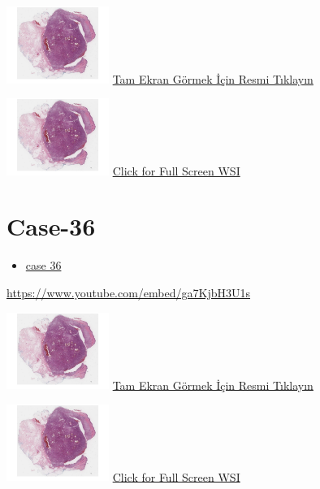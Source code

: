 \documentclass[
  letterpaper,
  paper=6in:9in,
  pagesize=pdftex,
  headinclude=on,
  footinclude=on,
  12pt]{scrbook}
\providecommand{\tightlist}{%
  \setlength{\itemsep}{0pt}\setlength{\parskip}{0pt}}\usepackage{longtable,booktabs,array}
\begin{document}
\href{https://images.patolojiatlasi.com/hacettepe-com-case-1/HE.html}{\includegraphics[width=0.25\textwidth,height=\textheight]{./screenshots/hacettepe-com-case-1_screenshot.png}}
\href{https://images.patolojiatlasi.com/hacettepe-com-case-/HE.html}{Tam
Ekran Görmek İçin Resmi Tıklayın}

\href{https://images.patolojiatlasi.com/hacettepe-com-case-1/HE.html}{\includegraphics[width=0.25\textwidth,height=\textheight]{./screenshots/hacettepe-com-case-1_screenshot.png}}
\href{https://images.patolojiatlasi.com/hacettepe-com-case-/HE.html}{Click
for Full Screen WSI}

\hypertarget{sec-hacettepe-case-of-the-month-case-36}{%
\section{Case-36}\label{sec-hacettepe-case-of-the-month-case-36}}

\begin{itemize}
\tightlist
\item
  \href{https://www.youtube.com/watch?v=ga7KjbH3U1s\&ab_channel=KemalKosemehmetoglu}{case
  36}
\end{itemize}

\url{https://www.youtube.com/embed/ga7KjbH3U1s}

\href{https://images.patolojiatlasi.com/hacettepe-com-case-1/HE.html}{\includegraphics[width=0.25\textwidth,height=\textheight]{./screenshots/hacettepe-com-case-1_screenshot.png}}
\href{https://images.patolojiatlasi.com/hacettepe-com-case-/HE.html}{Tam
Ekran Görmek İçin Resmi Tıklayın}

\href{https://images.patolojiatlasi.com/hacettepe-com-case-1/HE.html}{\includegraphics[width=0.25\textwidth,height=\textheight]{./screenshots/hacettepe-com-case-1_screenshot.png}}
\href{https://images.patolojiatlasi.com/hacettepe-com-case-/HE.html}{Click
for Full Screen WSI}
\end{document}
